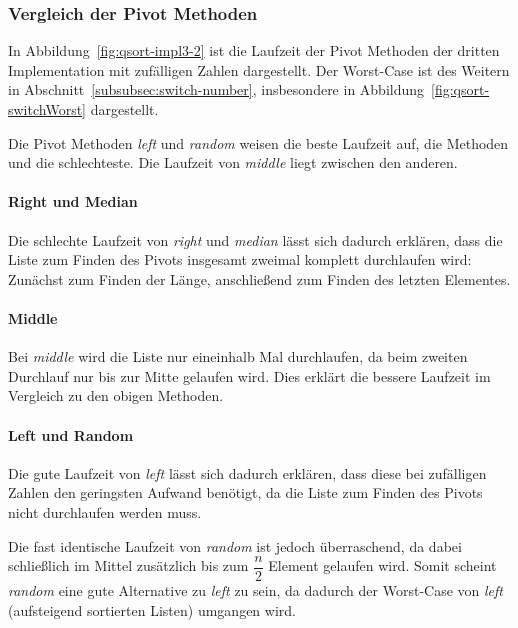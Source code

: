 \subsubsection{Vergleich der Pivot Methoden}\label{subsubsec:qsort-pivots}

In Abbildung~\ref{fig:qsort-impl3-2} ist die Laufzeit der Pivot Methoden der
dritten Implementation mit zufälligen Zahlen dargestellt.
Der Worst-Case ist des Weitern in Abschnitt~\ref{subsubsec:switch-number},
insbesondere in Abbildung~\ref{fig:qsort-switchWorst} dargestellt.

Die Pivot Methoden \textit{left} und \textit{random} weisen die beste
Laufzeit auf, die Methoden  und  die schlechteste.
Die Laufzeit von \textit{middle} liegt zwischen den anderen.

\paragraph{Right und Median}
Die schlechte Laufzeit von \textit{right} und \textit{median} lässt sich
dadurch erklären, dass die Liste zum Finden des Pivots insgesamt zweimal
komplett durchlaufen wird:
Zunächst zum Finden der Länge, anschließend zum Finden des letzten Elementes.

\paragraph{Middle}
Bei \textit{middle} wird die Liste nur eineinhalb Mal durchlaufen, da beim
zweiten Durchlauf nur bis zur Mitte gelaufen wird.
Dies erklärt die bessere Laufzeit im Vergleich zu den obigen Methoden.

\paragraph{Left und Random}
Die gute Laufzeit von \textit{left} lässt sich dadurch erklären, dass diese bei
zufälligen Zahlen den geringsten Aufwand benötigt, da die Liste zum Finden
des Pivots nicht durchlaufen werden muss.

Die fast identische Laufzeit von \textit{random} ist jedoch überraschend, da
dabei schließlich im Mittel zusätzlich bis zum \(\dfrac{n}{2}\) Element gelaufen
wird.
Somit scheint \textit{random} eine gute Alternative zu \textit{left} zu sein,
da dadurch der Worst-Case von \textit{left} (aufsteigend sortierten Listen)
umgangen wird.


